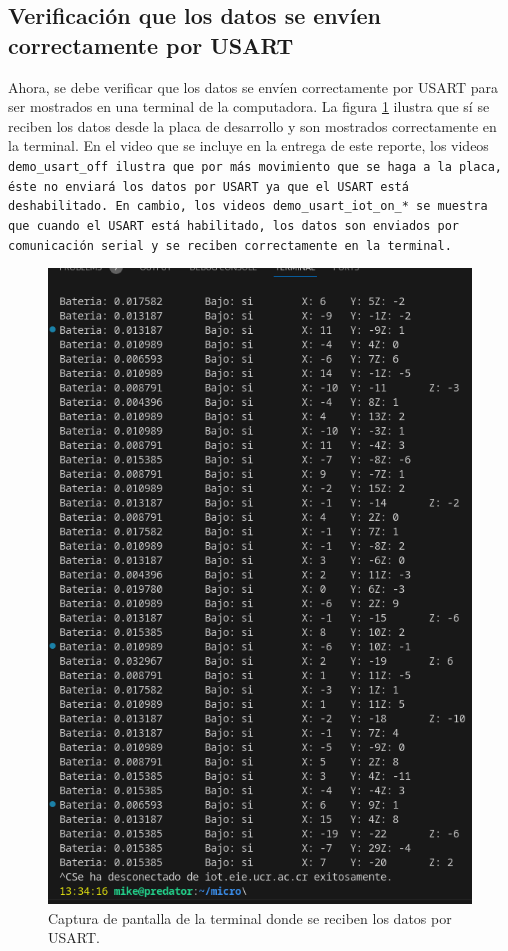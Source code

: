 \subsection{Verificación que los datos se envíen correctamente por USART}
Ahora, se debe verificar que los datos se envíen correctamente por USART para ser mostrados en una terminal de la computadora. La figura \ref{usart-data-received} ilustra que sí se reciben los datos desde la placa de desarrollo y son mostrados correctamente en la terminal. En el video que se incluye en la entrega de este reporte, los videos \tt{demo\_usart\_off} ilustra que por más movimiento que se haga a la placa, éste no enviará los datos por USART ya que el USART está deshabilitado. En cambio, los videos \tt{demo\_usart\_iot\_on\_*} se muestra que cuando el USART está habilitado, los datos son enviados por comunicación serial y se reciben correctamente en la terminal.
\begin{figure}[H]
    \centering
    \includegraphics[width=12cm]{Imagenes/usart_data_received.png}
    \caption{Captura de pantalla de la terminal donde se reciben los datos por USART.}
    \label{usart-data-received}
\end{figure}

